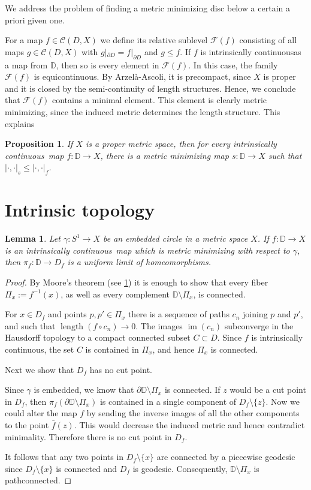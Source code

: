 \documentclass[a4paper,12pt]{article}
\newtheorem{lemma}{Lemma}
\newtheorem{proposition}{Proposition}
\theoremstyle{remark}\newtheorem*{remark}{Remark}
\theoremstyle{definition}\newtheorem{definition}{Definition}
\newcommand{\DD}{\mathbb D}
\newcommand{\len}{\operatorname{length}}
\newcommand{\im}{\operatorname{im}}
\newcommand{\ic}{intrinsically continuous}
\begin{document}
We address the problem of finding a
metric minimizing disc below a certain a priori given one.

For a map $f\in\mathcal{C}(D,X)$ we 
define its relative sublevel $\mathcal{F}(f)$ consisting of all maps $g\in\mathcal{C}(D,X)$
with $g|_{\partial D}=f|_{\partial D}$ and $g\leq f$. If $f$ is \ic as a map from $\DD$, then
so is every element in $\mathcal{F}(f)$. In this case, the family
$\mathcal{F}(f)$ is equicontinuous. 
By Arzel\`a-Ascoli, it is precompact, since $X$ is proper and it is
closed by the semi-continuity of length structures. Hence, we conclude 
that $\mathcal{F}(f)$ contains a 
minimal element. This element is clearly metric minimizing, since the induced metric 
determines the length structure. This explains

\begin{proposition}
 If $X$ is a proper metric space, then for every \ic\ map $f:\DD\rightarrow X$,
 there is a metric minimizing map $s:\DD\rightarrow X$
 such that $|\cdot,\cdot|_s\leq|\cdot,\cdot|_f$.
\end{proposition}



\section{Intrinsic topology}

\begin{lemma}\label{lem:inttop}
Let $\gamma:S^1\rightarrow X$ be an embedded circle in a 
metric space $X$.
If $f:\DD\rightarrow X$ is an \ic\ map which
is metric minimizing with respect to 
$\gamma$, then $\pi_f:\DD\rightarrow D_f$ is a 
uniform limit of homeomorphisms.
\end{lemma}

\begin{proof}
By Moore's theorem (see \ref{}) it is enough to show that every 
fiber $\Pi_x:=f^{-1}(x)$, as well as every complement 
$\DD\setminus\Pi_x$, is connected.

For $x\in D_f$ and points $p,p'\in\Pi_x$ there is a sequence 
of paths $c_n$ joining $p$ and $p'$, and such that 
$\len(f\circ c_n)\to 0$. The images $\im(c_n)$ subconverge
in the Hausdorff topology to a compact connected subset 
$C\subset D$. Since $f$ is \ic, the set $C$
is contained in $\Pi_x$, and hence $\Pi_x$ is connected.

Next we show that $D_f$ has no cut point.

Since $\gamma$ is embedded, we know that 
$\partial \DD\setminus \Pi_x$ is connected. If $z$ would be a 
cut point in $D_f$, then $\pi_f(\partial \DD\setminus \Pi_x)$
is contained in a single component of $D_f\setminus \{z\}$.
Now we could alter the map $f$ by sending the inverse images of
all the other components to the point $\bar f(z)$. 
This would decrease the induced metric and hence contradict 
minimality. Therefore there is no cut point in $D_f$.

It follows that any two points in $D_f\setminus\{x\}$ are connected
by a piecewise geodesic since $D_f\setminus\{x\}$ is connected
and $D_f$ is geodesic. Consequently, $\DD\setminus \Pi_x$ is 
pathconnected. 
\end{proof}
\end{document}
